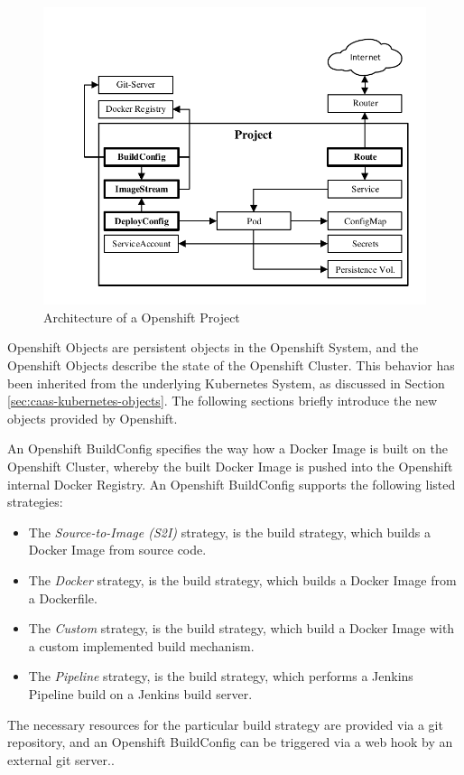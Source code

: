 \begin{figure}[htbp]
	\centering
	\includegraphics[scale=1]{images/openshift-project-architecture.pdf}
	\caption{Architecture of a Openshift Project}
	\label{fig:paas-openshift-project-architecture}
\end{figure} 

Openshift Objects are persistent objects in the Openshift System, and the Openshift Objects describe the state of the Openshift Cluster. This behavior has been inherited from the underlying Kubernetes System, as discussed in Section \vref{sec:caas-kubernetes-objects}. The following sections briefly introduce the new objects provided by Openshift. 

An Openshift BuildConfig specifies the way how a Docker Image is built on the Openshift Cluster, whereby the built Docker Image is pushed into the Openshift internal Docker Registry. An Openshift BuildConfig supports the following listed strategies:
\begin{itemize}
	\item The \emph{Source-to-Image (S2I)} strategy, is the build strategy, which builds a Docker Image from source code.
	\item The \emph{Docker} strategy, is the build strategy, which builds a Docker Image from a Dockerfile.
	\item The \emph{Custom} strategy, is the build strategy, which build a Docker Image with a custom implemented build mechanism.
	\item The \emph{Pipeline} strategy, is the build strategy, which performs a Jenkins Pipeline build on a Jenkins build server.
\end{itemize}
The necessary resources for the particular build strategy are provided via a git repository, and an Openshift BuildConfig can be triggered via a web hook by an external git server.\cite{S2I2018, OpenshiftBuildStrategies2018}. 

